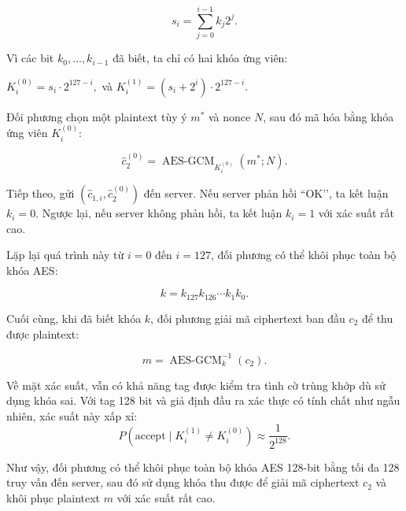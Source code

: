 \begin{loigiai}
$$
s_i=\sum_{j=0}^{i-1}k_j2^j.
$$

Vì các bit $k_0,\ldots,k_{i-1}$ đã biết, ta chỉ có hai khóa ứng viên:

$
K_i^{(0)}=s_i\cdot 2^{127-i},
$
và
$
K_i^{(1)}=(s_i+2^i)\cdot 2^{127-i}.
$

Đối phương chọn một plaintext tùy ý $m^*$ và nonce $N$, sau đó mã hóa bằng khóa ứng viên $K_i^{(0)}$:

$$
\hat{c}_2^{(0)}
=\operatorname{AES\text{-}GCM}_{K_i^{(0)}}(m^*;N).
$$

Tiếp theo, gửi $(\hat{c}_{1,i},\hat{c}_2^{(0)})$ đến server. Nếu server phản hồi ``OK’’, ta kết luận $k_i=0$. Ngược lại, nếu server không phản hồi, ta kết luận $k_i=1$ với xác suất rất cao.

Lặp lại quá trình này từ $i=0$ đến $i=127$, đối phương có thể khôi phục toàn bộ khóa AES:

$$
k=k_{127}k_{126}\cdots k_1k_0.
$$

Cuối cùng, khi đã biết khóa $k$, đối phương giải mã ciphertext ban đầu $c_2$ để thu được plaintext:

$$
\boxed{
m=\operatorname{AES\text{-}GCM}^{-1}_k(c_2).
}
$$

Về mặt xác suất, vẫn có khả năng tag được kiểm tra tình cờ trùng khớp dù sử dụng khóa sai. Với tag 128 bit và giả định đầu ra xác thực có tính chất như ngẫu nhiên, xác suất này xấp xỉ:
$$
P(\text{accept}\mid K_i^{(1)}\neq K_i^{(0)})
\approx \frac{1}{2^{128}}.
$$

Như vậy, đối phương có thể khôi phục toàn bộ khóa AES 128-bit bằng tối đa 128 truy vấn đến server, sau đó sử dụng khóa thu được để giải mã ciphertext $c_2$ và khôi phục plaintext $m$ với xác suất rất cao.

\end{loigiai}
